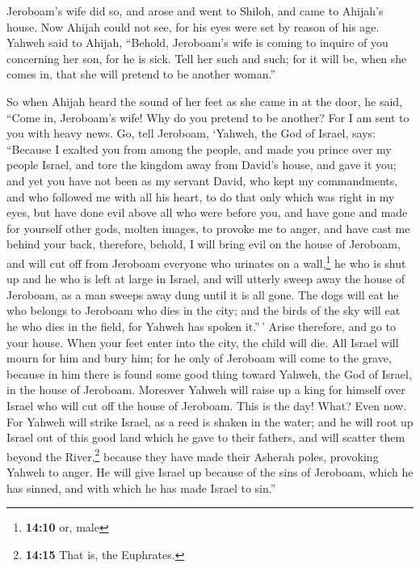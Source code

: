  Jeroboam's wife did so, and arose and went to Shiloh, and
came to Ahijah's house. Now Ahijah could not see, for his eyes were set
by reason of his age.  Yahweh said to Ahijah, ``Behold,
Jeroboam's wife is coming to inquire of you concerning her son, for he
is sick. Tell her such and such; for it will be, when she comes in, that
she will pretend to be another woman.''

 So when Ahijah heard the sound of her feet as she came in
at the door, he said, ``Come in, Jeroboam's wife! Why do you pretend to
be another? For I am sent to you with heavy news.  Go,
tell Jeroboam, `Yahweh, the God of Israel, says: ``Because I exalted you
from among the people, and made you prince over my people Israel,
 and tore the kingdom away from David's house, and gave it
you; and yet you have not been as my servant David, who kept my
commandments, and who followed me with all his heart, to do that only
which was right in my eyes,  but have done evil above all
who were before you, and have gone and made for yourself other gods,
molten images, to provoke me to anger, and have cast me behind your
back,  therefore, behold, I will bring evil on the house
of Jeroboam, and will cut off from Jeroboam everyone who urinates on a
wall,\footnote{\textbf{14:10} or, male} he who is shut up and he who is
left at large in Israel, and will utterly sweep away the house of
Jeroboam, as a man sweeps away dung until it is all gone.
 The dogs will eat he who belongs to Jeroboam who dies in
the city; and the birds of the sky will eat he who dies in the field,
for Yahweh has spoken it.''\,'  Arise therefore, and go
to your house. When your feet enter into the city, the child will die.
 All Israel will mourn for him and bury him; for he only
of Jeroboam will come to the grave, because in him there is found some
good thing toward Yahweh, the God of Israel, in the house of Jeroboam.
 Moreover Yahweh will raise up a king for himself over
Israel who will cut off the house of Jeroboam. This is the day! What?
Even now.  For Yahweh will strike Israel, as a reed is
shaken in the water; and he will root up Israel out of this good land
which he gave to their fathers, and will scatter them beyond the
River,\footnote{\textbf{14:15} That is, the Euphrates.} because they
have made their Asherah poles, provoking Yahweh to anger.
 He will give Israel up because of the sins of Jeroboam,
which he has sinned, and with which he has made Israel to sin.''

